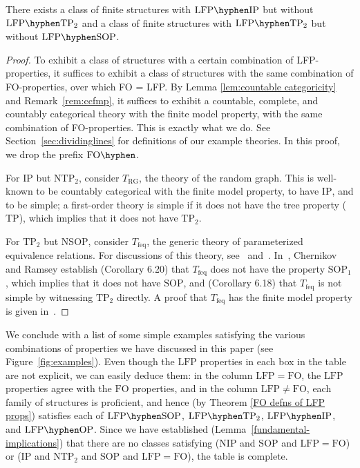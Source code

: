 \documentclass{lmcs}
\newcommand{\LFP}{\mathrm{LFP}}
\newcommand{\FO}{\mathrm{FO}}
\newcommand{\FOP}[1]{\FO\hyphen#1}
\newcommand{\LFPP}[1]{\LFP\hyphen#1}
\newcommand{\OP}{\mathrm{OP}}
\newcommand{\IP}{\mathrm{IP}}
\newcommand{\NIP}{\mathrm{NIP}}
\newcommand{\SOP}{\mathrm{SOP}}
\newcommand{\NSOP}{\mathrm{NSOP}}
\newcommand{\TP}{\mathrm{TP}}
\newcommand{\TPT}{\mathrm{TP}_2}
\newcommand{\NTPT}{\mathrm{NTP}_2}
\newcommand{\RG}{\mathrm{RG}}
\newcommand{\TFEQ}{T_{\mathrm{feq}}}
\theoremstyle{thmC}
\begin{document}
\begin{thm}\label{thm:otherway}
\label{thm:noncollapse} There exists a class of finite structures
with $\LFPP{\IP}$ but without $\LFPP{\TPT}$ and a class of finite structures
with $\LFPP{\TPT}$ but without $\LFPP{\SOP}$. 
\end{thm}
\begin{proof}

To exhibit a class of structures with a certain combination of LFP-properties, it suffices to exhibit a class of structures with the same combination of FO-properties, over which FO = LFP. By Lemma \ref{lem:countable categoricity} and Remark~\ref{rem:ccfmp}, it suffices to exhibit a countable, complete, and countably categorical theory with the finite model property, with the same combination of FO-properties.
This is exactly what we do. See Section~\ref{sec:dividinglines} for definitions of our example theories. In this proof, we drop the prefix $\FOP{}$. 

For $\IP$ but $\NTPT$, consider $T_{\RG}$, the theory of the random
graph. This is well-known to be countably categorical with the finite
model property, to have $\IP$, and to be simple; a first-order theory
is simple if it does not have the tree property ($\TP$), which implies
that it does not have $\TPT$.

For $\TPT$ but $\NSOP$, consider $\TFEQ$, the generic theory
of parameterized equivalence relations. For discussions of this theory,
see~\cite{CR} and~\cite{K}. In~\cite{CR}, Chernikov and Ramsey
establish (Corollary 6.20) that $\TFEQ$ does not have the property
$\SOP_1$, which implies that it does not have $\SOP$, and (Corollary 6.18)
that $\TFEQ$ is not simple by witnessing $\TPT$ directly.
A proof that $\TFEQ$ has the finite model property is
given in~\cite{K}. 
\end{proof}

We conclude with a list of some simple examples satisfying the various
combinations of properties we have discussed in this paper (see Figure~\ref{fig:examples}).
Even though the $\LFP$ properties in each box in the table are not explicit, we can easily deduce them: in the column $\LFP=\FO$, the $\LFP$ properties agree with the $\FO$ properties, and in the column $\LFP\neq\FO$, each family of structures is proficient, and hence (by Theorem \ref{FO defns of LFP props}) satisfies each of $\LFPP{\SOP}$,  $\LFPP{\TPT}$, $\LFPP{\IP}$, and $\LFPP{\OP}$. 
Since we have established (Lemma~\ref{fundamental-implications}) that there are no classes satisfying
($\NIP$ and $\SOP$ and $\LFP=\FO$) or ($\IP$ and $\NTPT$ and $\SOP$ and $\LFP=\FO$), the table is complete.
\end{document}
